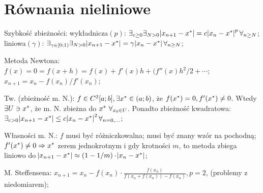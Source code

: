 \section{Równania nieliniowe}



\entry
Szybkość zbieżności:
wykładnicza$(p)$:
$\exists_{c \geq 0} \exists_{N > 0}
\abs{x_{n + 1} - x^{*}} = c \abs{x_n - x^{*}}^p \forall_{n \geq N}$;
liniowa$(\gamma)$:
$\exists_{\gamma \in [0;1)} \exists_{N > 0}
\abs{x_{n + 1} - x^{*}} = \gamma \abs{x_n - x^{*}} \forall_{n \geq N}$;

\entry
Metoda Newtona:
$f(x) = 0 = f(x+h) = f(x) + f'(x)h + (f''(x)h^2/2+\cdots$;
$x_{n+1} = x_n - f(x_n)/f'(x_n)$;

\entry
Tw. (zbieżność m. N.):
$f \in C^2[a;b], \exists x^{*} \in (a;b)$,
że $f(x^{*})=0, f'(x^{*}) \neq 0$.
Wtedy $\exists{U \ni x^{*}}$, że m. N. zbieżna do $x^{*} \ \forall_{x_0 \in U}$.
Ponadto zbieżność kwadratowa:
$\exists_{c>0} \abs{x_{n+1} - x^{*}} \leq c \abs{x_n - x^{*}}^2 \forall_{n=0,\ldots}$;

\entry
Własności m. N.:
\subentry
$f$ musi być różniczkowalna;
\subentry
musi być znany wzór na pochodną;
\subentry
$f'(x^{*}) \neq 0 \Rightarrow x^{*}$ zerem jednokrotnym i gdy krotności $m$, 
to metoda zbiega liniowo do 
$\abs{x_{n+1} - x^{*}} \approx (1-1/m) \cdot \abs{x_n - x^{*}}$;



\entry
M. Steffensena:
$x_{n+1} = x_n - f(x_n) \cdot \frac{f(x_n)}{f(x_n + f(x_n)) - f(x_n)}, p=2$,
(problemy z niedomiarem);





